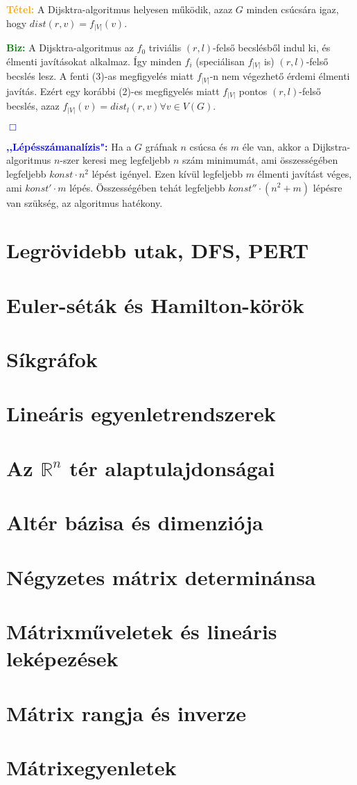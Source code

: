 \documentclass[12pt]{article}
\begin{document}
			\textcolor{orange}{\textbf{Tétel:}} A Dijsktra-algoritmus helyesen működik, azaz $G$ minden csúcsára igaz, hogy $dist(r,v) = f_{|V|}(v)$.

			\textcolor{green}{\textbf{Biz:}} A Dijsktra-algoritmus az $f_0$ triviális $(r,l)$-felső becslésből indul ki, és élmenti javításokat alkalmaz. Így minden $f_i$ (speciálisan $f_{|V|}$ is) $(r,l)$-felső becslés lesz. A fenti (3)-as megfigyelés miatt $f_{|V|}$-n nem  végezhető érdemi élmenti javítás. Ezért egy korábbi (2)-es megfigyelés miatt $f_{|V|}$ pontos $(r,l)$-felső becslés, azaz $f_{|V|}(v) = dist_l(r,v) \forall v \in V(G)$. \raggedright \textcolor{blue}{$\Box$}

			\textbf{\textcolor{blue}{,,Lépésszámanalízis":}} Ha a $G$ gráfnak $n$ csúcsa és $m$ éle van, akkor a Dijkstra-algoritmus $n$-szer keresi meg legfeljebb $n$ szám minimumát, ami összességében legfeljebb $konst \cdot n^2$ lépést igényel. Ezen kívül legfeljebb $m$ élmenti javítást véges, ami $konst' \cdot m$ lépés. Összességében tehát legfeljebb $konst'' \cdot (n^2 + m)$ lépésre van szükség, az algoritmus hatékony. 

	\section{Legrövidebb utak, DFS, PERT}
		
	\section{Euler-séták és Hamilton-körök}
	
	\section{Síkgráfok}
	
	\section{Lineáris egyenletrendszerek}
	
	\section{Az $\mathbb{R}^n$ tér alaptulajdonságai}
	
	\section{Altér bázisa és dimenziója}
	
	\section{Négyzetes mátrix determinánsa}
	
	\section{Mátrixműveletek és lineáris leképezések}
	
	\section{Mátrix rangja és inverze}
	
	\section{Mátrixegyenletek}
	
\end{document}

